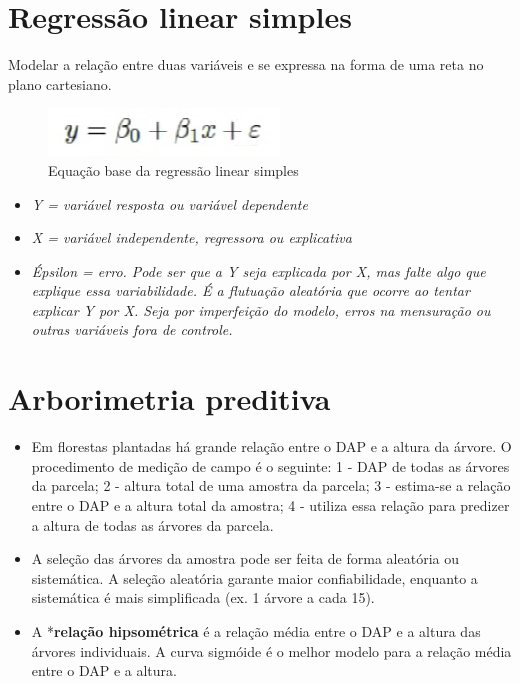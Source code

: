\documentclass[
]{article}
\providecommand{\tightlist}{%
  \setlength{\itemsep}{0pt}\setlength{\parskip}{0pt}}
\begin{document}
\section{Regressão linear simples}\label{regressuxe3o-linear-simples}

Modelar a relação entre duas variáveis e se expressa na forma de uma
reta no plano cartesiano.

\begin{figure}

{\centering \includegraphics[width=0.8\linewidth]{IMAGES/eq-base-regressao-linear} 

}

\caption{Equação base da regressão linear simples}\label{fig:unnamed-chunk-22}
\end{figure}

\begin{itemize}
\tightlist
\item
  \emph{Y = variável resposta ou variável dependente}\\
\item
  \emph{X = variável independente, regressora ou explicativa}\\
\item
  \emph{Épsilon = erro. Pode ser que a Y seja explicada por X, mas falte
  algo que explique essa variabilidade. É a flutuação aleatória que
  ocorre ao tentar explicar Y por X. Seja por imperfeição do modelo,
  erros na mensuração ou outras variáveis fora de controle.}
\end{itemize}

\newpage

\section{Arborimetria preditiva}\label{arborimetria-preditiva}

\begin{itemize}
\item
  Em florestas plantadas há grande relação entre o DAP e a altura da
  árvore. O procedimento de medição de campo é o seguinte: 1 - DAP de
  todas as árvores da parcela; 2 - altura total de uma amostra da
  parcela; 3 - estima-se a relação entre o DAP e a altura total da
  amostra; 4 - utiliza essa relação para predizer a altura de todas as
  árvores da parcela.
\item
  A seleção das árvores da amostra pode ser feita de forma aleatória ou
  sistemática. A seleção aleatória garante maior confiabilidade,
  enquanto a sistemática é mais simplificada (ex. 1 árvore a cada 15).
\item
  A *\textbf{relação hipsométrica} é a relação média entre o DAP e a
  altura das árvores individuais. A curva sigmóide é o melhor modelo
  para a relação média entre o DAP e a altura.
\end{itemize}
\end{document}
